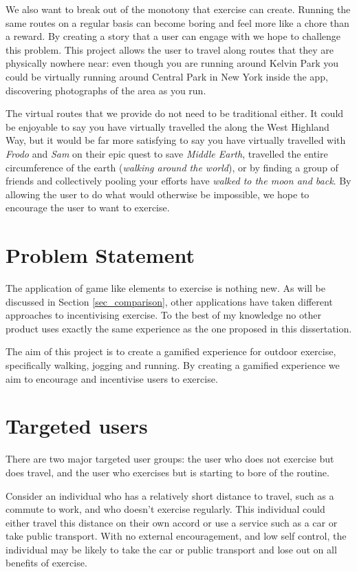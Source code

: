 We also want to break out of the monotony that exercise can
create. Running the same routes on a regular basis can become boring
and feel more like a chore than a reward. By creating a story that a
user can engage with we hope to challenge this problem. This project
allows the user to travel along routes that they are physically
nowhere near: even though you are running around Kelvin Park you could
be virtually running around Central Park in New York inside the app,
discovering photographs of the area as you run. 

The virtual routes that we provide do not need to be traditional
either. It could be enjoyable to say you have virtually travelled the
along the West Highland Way, but it would be far more satisfying to
say you have virtually travelled with \emph{Frodo} and \emph{Sam} on
their epic quest to save \emph{Middle Earth}, travelled the entire
circumference of the earth (\emph{walking around the world}), or by
finding a group of friends and collectively pooling your efforts have
\emph{walked to the moon and back}. By allowing the user to do what
would otherwise be impossible, we hope to encourage the user to want
to exercise. 

\section{Problem Statement}

The application of game like elements to exercise is nothing new. As
will be discussed in Section \ref{sec_comparison}, other applications
have taken different approaches to incentivising exercise. To the best
of my knowledge no other product uses exactly the same experience
as the one proposed in this dissertation.

The aim of this project is to create a gamified experience for outdoor
exercise, specifically walking, jogging and running. By creating a
gamified experience we aim to encourage and incentivise users to
exercise. 

\section{Targeted users}
\label{sec:targeted_users}
There are two major targeted user groups: the user who does not
exercise but does travel, and the user who exercises but is starting
to bore of the routine.

Consider an individual who has a relatively short distance to travel,
such as a commute to work,
and who doesn't exercise regularly. This individual could either
travel this distance on their own accord or use a service such as a
car or take public transport. With no external encouragement, and low
self control, the individual may be likely to take the car or public
transport and lose out on all benefits of exercise. 

